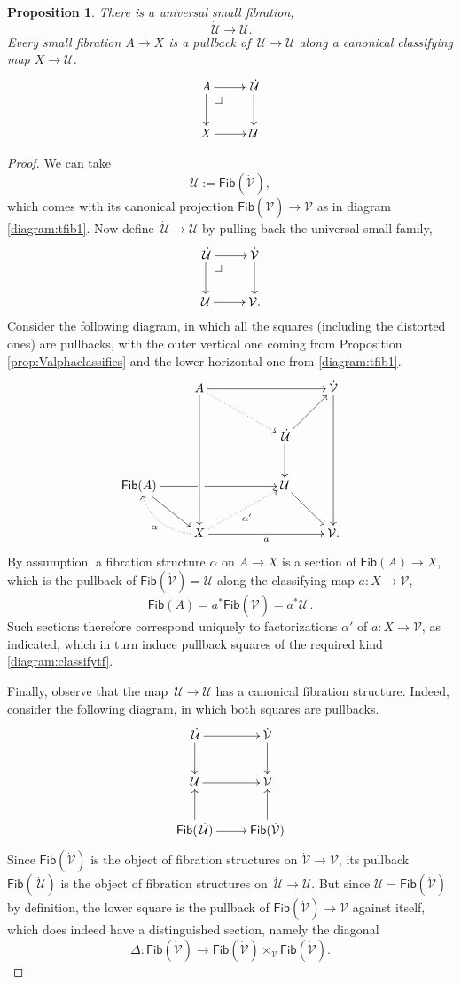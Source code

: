 \documentclass[11pt]{article}
\makeatletter
\newcommand{\xypbcorner}[1][dr]{\save*!/#1-1.5pc/#1:(-1,1)@^{|-}\restore}
\newcommand{\ra}{\ensuremath{\rightarrow}}
\renewcommand{\to}{\ensuremath{\rightarrow}}
\newcommand{\too}{\ensuremath{\longrightarrow}}
\newcommand{\U}{\ensuremath{\mathcal{U}}}
\newcommand{\UU}{\ensuremath{\,\dot{\mathcal{U}}}}
\newcommand{\V}{\ensuremath{\mathcal{V}}}
\newcommand{\VV}{\ensuremath{\dot{\mathcal{V}}}}
\newcommand{\Fib}{\ensuremath{\mathsf{Fib}}}
\newtheorem{proposition}[theorem]{Proposition}
\theoremstyle{remark}
\theoremstyle{definition}
\makeatother
\begin{document}
\begin{proposition}\label{prop:classTFib}
There is a \emph{universal small fibration}, 
\[
\UU\too\U.
\]
 Every small fibration $A \ra X$ is a pullback of $\UU\ra\U$ along a canonical classifying map $X\ra \U$.
\begin{equation}\label{diagram:classifytf}
\xymatrix{
A \ar[d] \ar[r]  \xypbcorner & \UU\ar[d]\\
X \ar[r] & \U
}
\end{equation}
\end{proposition}
%
\begin{proof}
We can take 
\[
\U := \Fib(\VV),
\]
which comes with its canonical projection $\Fib(\VV) \ra \V$ as in diagram \eqref{diagram:tfib1}.  Now define $\UU\ra\U$ by pulling back the universal small family,
\[
\xymatrix{
\UU \ar[d] \ar[r] \xypbcorner  & \VV \ar[d] \\
\U \ar[r] & \V.
}
\]
Consider the following diagram, in which all the squares (including the distorted ones) are pullbacks, with the outer vertical one coming from Proposition \ref{prop:Valphaclassifies} and the lower horizontal one from \eqref{diagram:tfib1}.
%
\begin{equation}\label{diagram:classifytf2}
\xymatrix{
&A \ar[ddd] \ar[rrr]   \ar@{.>}[rrd] &&& \VV\ar[ddd]\\
& && \UU \ar[d] \ar[ru]  &\\
\Fib(A) \ar[rd] \ar[rrr] |<<<<<<<<<<<<\hole  &&& \U \ar[rd] &\\
&X \ar[rrr]_{a} \ar@{.>}@/^1pc/[lu]^\alpha \ar@{.>}[rru]_{\alpha'} &&& \V.
}
\end{equation}
%
By assumption, a fibration structure $\alpha$ on $A\ra X$ is a section of $\Fib(A)\to X$, which is the pullback of $\Fib(\VV)=\U$ along the classifying map $a: X \to \V$,
\[
\Fib(A) =  a^*\Fib(\VV) = a^*\U\,.
\]
Such sections therefore correspond uniquely to factorizations $\alpha'$ of $a : X\to\V$, as indicated, which in turn induce pullback squares of the required kind \eqref{diagram:classifytf}.

Finally, observe that the map $\UU\to\U$ has a canonical fibration structure. Indeed, consider the following diagram, in which both squares are pullbacks.
\begin{equation}\label{diagram:fibisfib}
\xymatrix{
\UU \ar[d] \ar[r]  & \VV \ar[d]\\
\U \ar[r] & \V\\
\Fib(\UU) \ar[u] \ar[r] & \Fib(\VV)\ar[u].
}
\end{equation}
Since $\Fib(\VV)$ is the object of fibration structures on $\VV\ra\V$, its pullback $\Fib(\UU)$ is the object of fibration structures on $\UU\ra\U$.
But since $\U = \Fib(\VV)$ by definition, the lower square is the pullback of $\Fib(\VV)\ra \V$ against itself, which does indeed have a distinguished section, namely the diagonal
\[
\Delta : \Fib(\VV) \ra \Fib(\VV)\times_\V\Fib(\VV).
\]
\end{proof}
\end{document}
